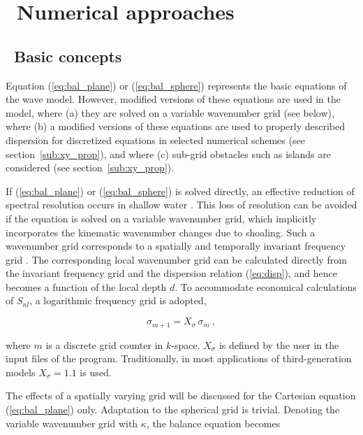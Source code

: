 
\section{~Numerical approaches} \label{chapt:num}
\newcounters
\vssub
\subsection{~Basic concepts} \label{sec:basic_num}
\vssub

Equation (\ref{eq:bal_plane}) or (\ref{eq:bal_sphere}) represents the basic
equations of the wave model. However, modified versions of these equations are
used in the model, where (a) they are solved on a variable wavenumber grid
(see below), where (b) a modified versions of these equations are used to
properly described dispersion for discretized equations in selected numerical
schemes (see section~\ref{sub:xy_prop}), and where (c) sub-grid obstacles such
as islands are considered (see section~\ref{sub:xy_prop}).

If (\ref{eq:bal_plane}) or (\ref{eq:bal_sphere}) is solved directly, an
effective reduction of spectral resolution occurs in shallow water
\citep[see][]{tol:GAOS98b}. This loss of resolution can be avoided if the
equation is solved on a variable wavenumber grid, which implicitly
incorporates the kinematic wavenumber changes due to shoaling. Such a
wavenumber grid corresponds to a spatially and temporally invariant frequency
grid \citep{tol:GAOS98b}. The corresponding local wavenumber grid can be
calculated directly from the invariant frequency grid and the dispersion
relation (\ref{eq:disp}), and hence becomes a function of the local depth
$d$. To accommodate economical calculations of $S_{nl}$, a logarithmic
frequency grid is adopted,


\begin{equation}
\sigma_{m+1} = X_\sigma \, \sigma_m \: , \label{eq:sigma_grid}
\end{equation}

\noindent
where $m$ is a discrete grid counter in $k$-space. $X_\sigma$ is defined by
the user in the input files of the program. Traditionally, in most
applications of third-generation models $X_\sigma = 1.1$ is used.

The effects of a spatially varying grid will be discussed for the Cartesian
equation (\ref{eq:bal_plane}) only. Adaptation to the spherical grid is
trivial. Denoting the variable wavenumber grid with $\kappa$, the balance
equation becomes

